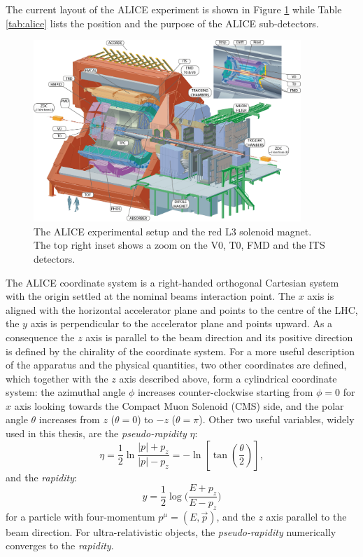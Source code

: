 The current layout of the ALICE experiment is shown in Figure \ref{fig:alice3D} while Table 
\ref{tab:alice} lists the position and the purpose of the ALICE sub-detectors.
\begin{figure}
    \centering
    \includegraphics[width=0.9\textwidth]{gfx/alice3D}
	\caption{The ALICE experimental setup and the red L3 solenoid magnet. The top right inset shows a zoom on the V0, T0, FMD and the ITS detectors.}
	\label{fig:alice3D}
\end{figure}
The ALICE coordinate system is a right-handed orthogonal Cartesian system with the origin settled at
the nominal beams interaction point.
The $x$ axis is aligned with the horizontal accelerator plane and points to the centre of the LHC,
the $y$ axis is perpendicular to the accelerator plane and points upward.
As a consequence the $z$ axis is parallel to the beam direction and its positive direction is 
defined by the chirality of the coordinate system. 
For a more useful description of the apparatus and the physical quantities, two other coordinates
are defined, which together with the $z$ axis described above, form a cylindrical coordinate system:
the azimuthal angle $\phi$ increases counter-clockwise starting from $\phi = 0$ for $x$ axis looking
towards the Compact Muon Solenoid (CMS) side, and the polar angle $\theta$ increases from $z$ ($\theta=0$) to $-z$ 
($\theta=\pi$).
Other two useful variables, widely used in this thesis, are the \textit{pseudo-rapidity} $\eta$:
\begin{equation}
    \eta = \frac{1}{2} \ln \frac{|p| + p_{z}}{|p| - p_{z}} =
     - \ln \left[ \tan \left(\frac{\theta}{2} \right) \right],
\end{equation}
and the \textit{rapidity}:
\begin{equation} \label{eq:rapidity}
    y = \frac{1}{2} \log \bigl( \frac{E+p_{z}}{E-p_{z}} \bigr) 
\end{equation}
for a particle with four-momentum $p^{\mu} = (E,\vec{p})$, and the $z$ axis parallel to the beam 
direction.
For ultra-relativistic objects, the \textit{pseudo-rapidity} numerically converges to the 
\textit{rapidity}.

